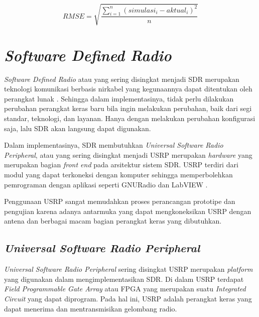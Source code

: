 \begin{equation}
	RMS E = \sqrt{\frac{\sum_{i = 1}^{n} (simulasi_{i}-aktual_{i})^2}{n}}
	\label{eq:rmsE}
\end{equation}

\section{\textit{Software Defined Radio}}
\textit{Software Defined Radio} atau yang sering disingkat menjadi SDR merupakan teknologi komunikasi berbasis nirkabel yang kegunaannya dapat ditentukan oleh perangkat lunak \cite{Anisah2018}. Sehingga dalam implementasinya, tidak perlu dilakukan perubahan perangkat keras baru bila ingin melakukan perubahan, baik dari segi standar, teknologi, dan layanan. Hanya dengan melakukan perubahan konfigurasi saja, lalu SDR akan langsung dapat digunakan. 

Dalam implementasinya, SDR membutuhkan \textit{Universal Software Radio Peripheral}, atau yang sering disingkat menjadi USRP merupakan \textit{hardware} yang merupakan bagian \textit{front end} pada arsitektur sistem SDR. USRP terdiri dari modul yang dapat terkoneksi dengan komputer sehingga memperbolehkan pemrograman dengan aplikasi seperti GNURadio dan LabVIEW \cite{Gulo2023}. 

Penggunaan USRP sangat memudahkan proses perancangan prototipe dan pengujian karena adanya antarmuka yang dapat mengkoneksikan USRP dengan antena dan berbagai macam bagian perangkat keras yang dibutuhkan.

\subsection{\textit{Universal Software Radio Peripheral}}

\textit{Universal Software Radio Peripheral} sering disingkat USRP merupakan \textit{platform} yang digunakan dalam mengimplementasikan SDR. Di dalam USRP terdapat \textit{Field Programmable Gate Array} atau FPGA yang merupakan suatu \textit{Integrated Circuit} yang dapat diprogram. Pada hal ini, USRP adalah perangkat keras yang dapat menerima dan mentransmisikan gelombang radio.

